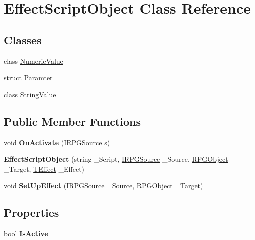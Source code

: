\hypertarget{class_effect_script_object}{}\section{Effect\+Script\+Object Class Reference}
\label{class_effect_script_object}
\subsection*{Classes}
\begin{DoxyCompactItemize}
\item 
class \hyperlink{class_effect_script_object_1_1_numeric_value}{Numeric\+Value}
\item 
struct \hyperlink{struct_effect_script_object_1_1_paramter}{Paramter}
\item 
class \hyperlink{class_effect_script_object_1_1_string_value}{String\+Value}
\end{DoxyCompactItemize}
\subsection*{Public Member Functions}
\begin{DoxyCompactItemize}
\item 
\hypertarget{class_effect_script_object_ab6709e3186a3e37df774d961a06600a6}{}void {\bfseries On\+Activate} (\hyperlink{interface_i_r_p_g_source}{I\+R\+P\+G\+Source} s)\label{class_effect_script_object_ab6709e3186a3e37df774d961a06600a6}

\item 
\hypertarget{class_effect_script_object_a1f68ebfee4023bf30a52ea9408970523}{}{\bfseries Effect\+Script\+Object} (string \+\_\+\+Script, \hyperlink{interface_i_r_p_g_source}{I\+R\+P\+G\+Source} \+\_\+\+Source, \hyperlink{class_r_p_g_object}{R\+P\+G\+Object} \+\_\+\+Target, \hyperlink{class_t_effect}{T\+Effect} \+\_\+\+Effect)\label{class_effect_script_object_a1f68ebfee4023bf30a52ea9408970523}

\item 
\hypertarget{class_effect_script_object_aaa6b0f4677c9ee3de33693789ed271e4}{}void {\bfseries Set\+Up\+Effect} (\hyperlink{interface_i_r_p_g_source}{I\+R\+P\+G\+Source} \+\_\+\+Source, \hyperlink{class_r_p_g_object}{R\+P\+G\+Object} \+\_\+\+Target)\label{class_effect_script_object_aaa6b0f4677c9ee3de33693789ed271e4}

\end{DoxyCompactItemize}
\subsection*{Properties}
\begin{DoxyCompactItemize}
\item 
\hypertarget{class_effect_script_object_aa7393df152fc5f74e6e1090dee001506}{}bool {\bfseries Is\+Active}\label{class_effect_script_object_aa7393df152fc5f74e6e1090dee001506}

\end{DoxyCompactItemize}


